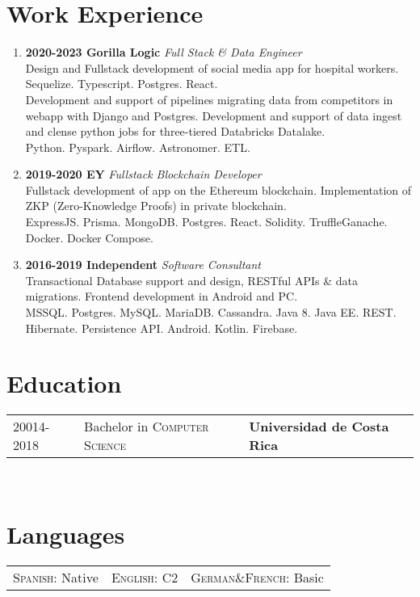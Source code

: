 \documentclass[a4paper,11pt]{article}
\begin{document}
\section{Work Experience}
\begin{enumerate}
    \item \textbf{2020-2023 Gorilla Logic} \emph{Full Stack \& Data Engineer} \\
    Design and Fullstack development of social media app for hospital workers.\\
    Sequelize. Typescript. Postgres. React. \\
    Development and support of pipelines migrating data from competitors in webapp with Django and Postgres.
    Development and support of data ingest and clense python jobs for three-tiered Databricks Datalake.  \\ 
    Python. Pyspark. Airflow. Astronomer. ETL. 
    \item \textbf{2019-2020 EY}   \emph{Fullstack Blockchain Developer} \\
    Fullstack development  of app on the Ethereum blockchain. Implementation of ZKP (Zero-Knowledge Proofs) in private blockchain. \\
    ExpressJS. Prisma. MongoDB. Postgres. React. Solidity. TruffleGanache. Docker. Docker Compose.
    \item \textbf{2016-2019 Independent} \emph{Software Consultant} \\
    Transactional Database support and design, RESTful APIs \& data migrations. Frontend development in Android and PC.\\
    MSSQL. Postgres. MySQL. MariaDB. Cassandra. Java 8. Java EE. REST. Hibernate. Persistence API. Android. Kotlin. Firebase. \\
\end{enumerate}

\section{Education}
\begin{tabular}{lll}\\
 \textsc{20014-2018} \quad & Bachelor in  \textsc{Computer Science} \quad& \textbf{Universidad de Costa Rica}\quad\\
\end{tabular}\\

\section{Languages}
\begin{tabular}{lll}\\
\textsc{Spanish:} Native \quad &\textsc{English:} C2 \quad &\textsc{German\&French:} Basic\quad \\
\end{tabular}\\
\vspace{5mm} %
\end{document}
